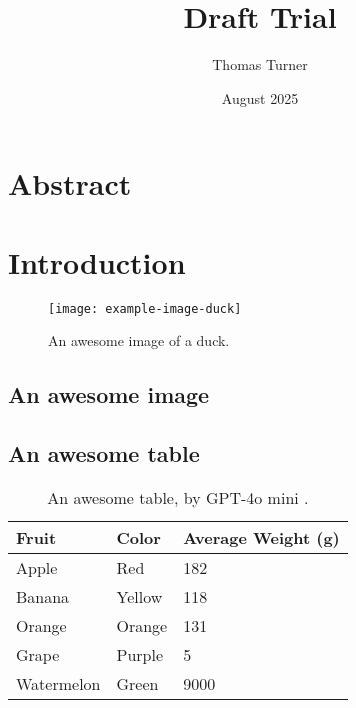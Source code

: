 \documentclass{report_template_oxford}
\title{Draft Trial}
\subtitle{}
\author{Thomas Turner}
\date{August 2025}
\begin{document}
\maketitle
\newpage
{}
\section*{Abstract}

\lipsum[1]

\newpage
\tableofcontents

\newpage
{}
\listoffigures

\newpage
{}
\listoftables

\newpage
{}
\printglossaries


\newpage
{}
\section{Introduction}
\lipsum[1-5]

\begin{figure}
    \centering
    \texttt{[image: example-image-duck]}
    \caption{An awesome image of a duck.}
    \label{fig:enter-label}
\end{figure}

\subsection{An awesome image}

\lipsum[1-2]


\subsection{An awesome table}

\begin{table}[h]
    \centering
    \begin{tabular}{@{}lll@{}}
        \toprule
        \textbf{Fruit} & \textbf{Color} & \textbf{Average Weight (g)} \\ \midrule
        Apple          & Red            & 182                        \\
        Banana         & Yellow         & 118                        \\
        Orange         & Orange         & 131                        \\
        Grape          & Purple         & 5                          \\
        Watermelon     & Green          & 9000                       \\ \bottomrule
    \end{tabular}
    \caption{An awesome table, by GPT-4o mini \cite{achiam2023gpt}.}
    \label{tab:my_label}
\end{table}
\end{document}
